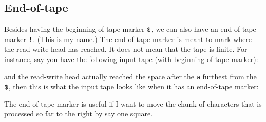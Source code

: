 

\newpage
\subsection{End-of-tape}

Besides having the beginning-of-tape marker $\operatorname{\text{\texttt{\$}}}$,
we can also have an end-of-tape marker $\operatorname{\text{\texttt{!}}}$.
(This is my name.)
The end-of-tape marker is meant to mark where the read-write head has reached.
It does not mean that the tape is finite.
For instance, say you have the following input tape (with beginning-of
tape marker):



and the read-write head actually reached the space after
the \texttt{a} furthest from the $\operatorname{\text{\texttt{\$}}}$, then
this is what the input tape looks like when it has an end-of-tape marker:



The end-of-tape marker is useful if I want to move the chunk of 
characters that is processed so far to the right by say one square.




